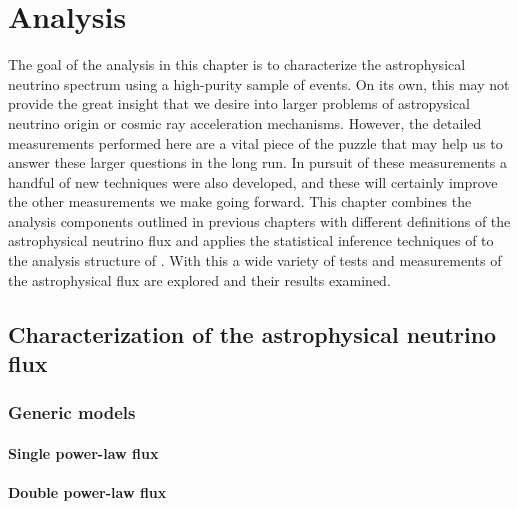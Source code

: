 \chapter{Analysis}\label{chapter:analysis}

The goal of the analysis in this chapter is to characterize the astrophysical neutrino spectrum using a high-purity sample of events.
On its own, this may not provide the great insight that we desire into larger problems of astropysical neutrino origin or cosmic ray acceleration mechanisms.
However, the detailed measurements performed here are a vital piece of the puzzle that may help us to answer these larger questions in the long run.
In pursuit of these measurements a handful of new techniques were also developed, and these will certainly improve the other measurements we make going forward.
This chapter combines the analysis components outlined in previous chapters with different definitions of the astrophysical neutrino flux and applies the statistical inference techniques of  to the analysis structure of .
With this a wide variety of tests and measurements of the astrophysical flux are explored and their results examined.

\section{Characterization of the astrophysical neutrino flux\label{sec:diffuse}}
\begingroup
\graphicspath{{results/HESE_Final_Paper/}}

\endgroup
\FloatBarrier

\subsection{Generic models\label{sec:generic_models}}
\begingroup
\graphicspath{{results/HESE_Final_Paper/}}

\endgroup
\FloatBarrier

\subsubsection{Single power-law flux\label{sec:spl}}
\begingroup
\graphicspath{{results/HESE_Final_Paper/}}

\endgroup
\FloatBarrier

\subsubsection{Double power-law flux\label{sec:dpl}}
\begingroup
\graphicspath{{results/HESE_Final_Paper/}}

\endgroup
\FloatBarrier

